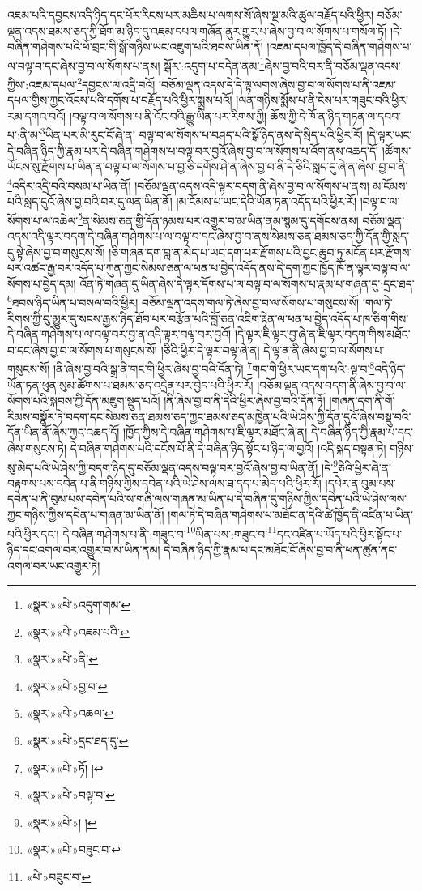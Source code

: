 འཇམ་པའི་དབྱངས་འདི་ཉིད་དང་པོར་རིངས་པར་མཆིས་པ་ལགས་སོ་ཞེས་སྔ་མའི་ཚུལ་བརྗོད་པའི་ཕྱིར། བཅོམ་ལྡན་འདས་ཐམས་ཅད་ཀྱི་ཐོག་མ་ཉིད་དུ་འཇམ་དཔལ་གཞོན་ནུར་གྱུར་པ་ཞེས་བྱ་བ་ལ་སོགས་པ་གསོལ་ཏོ། །དེ་བཞིན་གཤེགས་པའི་ཕོ་བྲང་གི་སྒོ་གཉིས་ཡང་འཇུག་པའི་ཐབས་ཡིན་ནོ། །འཇམ་དཔལ་ཁྱོད་དེ་བཞིན་གཤེགས་པ་ལ་བལྟ་བ་དང་ཞེས་བྱ་བ་ལ་སོགས་པ་ནས། སྒོར་:འདུག་པ་བདེན་ནམ་\footnote{«སྣར་»«པེ་»འདུག་གམ་}ཞེས་བྱ་བའི་བར་ནི་བཅོམ་ལྡན་འདས་ཀྱིས་:འཇམ་དཔལ་\footnote{«སྣར་»«པེ་»འཇམ་པའི་}དབྱངས་ལ་འདྲི་བའོ། །བཅོམ་ལྡན་འདས་དེ་དེ་ལྟ་ལགས་ཞེས་བྱ་བ་ལ་སོགས་པ་ནི་འཇམ་དཔལ་གྱིས་ཀྱང་འོངས་པའི་དགོས་པ་བརྗོད་པའི་ཕྱིར་སྨྲས་པའོ། །ལན་གཉིས་སྨོས་པ་ནི་ངེས་པར་གཟུང་བའི་ཕྱིར་རམ་དགའ་བའོ། །བལྟ་བ་ལ་སོགས་པ་ནི་འོང་བའི་རྒྱུ་ཡིན་པར་རིགས་ཀྱི། ཆོས་ཀྱི་དེ་ཁོ་ན་ཉིད་གཏན་ལ་དབབ་པ་:ནི་མ་\footnote{«སྣར་»«པེ་»ནི་}ཡིན་པར་མི་རུང་ངོ་ཞེ་ན། བལྟ་བ་ལ་སོགས་པ་བཤད་པའི་སྒོ་ཉིད་ནས་དེ་སྲིད་པའི་ཕྱིར་རོ། །དེ་ལྟར་ཡང་དེ་བཞིན་ཉིད་ཀྱི་རྣམ་པར་དེ་བཞིན་གཤེགས་པ་བལྟ་བར་བྱའོ་ཞེས་བྱ་བ་ལ་སོགས་པ་འོག་ནས་འཆད་དོ། །ཚོགས་ཡོངས་སུ་རྫོགས་པ་ཡིན་ན་བལྟ་བ་ལ་སོགས་པ་བྱ་ཅི་དགོས་ཤེ་ན་ཞེས་བྱ་བ་ནི་དེ་ཅིའི་སླད་དུ་ཞེ་ན་ཞེས་:བྱ་བ་ནི་\footnote{«སྣར་»«པེ་»བྱ་བ་}འདིར་འདྲི་བའི་བསམ་པ་ཡིན་ནོ། །བཅོམ་ལྡན་འདས་འདི་ལྟར་བདག་ནི་ཞེས་བྱ་བ་ལ་སོགས་པ་ནས། མ་ངོམས་པའི་སླད་དུའོ་ཞེས་བྱ་བའི་བར་དུ་ལན་ཡིན་ནོ། །མ་ངོམས་པ་ཡང་དེའི་ཡོན་ཏན་འདོད་པའི་ཕྱིར་རོ། །བལྟ་བ་ལ་སོགས་པ་ལ་འཆེལ་\footnote{«སྣར་»«པེ་»འཆལ་}ན་སེམས་ཅན་གྱི་དོན་ཉམས་པར་འགྱུར་བ་མ་ཡིན་ནམ་སྙམ་དུ་དགོངས་ནས། བཅོམ་ལྡན་འདས་འདི་ལྟར་བདག་དེ་བཞིན་གཤེགས་པ་ལ་བལྟ་བ་དང་ཞེས་བྱ་བ་ནས་སེམས་ཅན་ཐམས་ཅད་ཀྱི་དོན་གྱི་སླད་དུ་སྟེ་ཞེས་བྱ་བ་གསུངས་སོ། །ཅི་གཞན་དག་བླ་ན་མེད་པ་ཡང་དག་པར་རྫོགས་པའི་བྱང་ཆུབ་ཏུ་མངོན་པར་རྫོགས་པར་འཚང་རྒྱ་བར་འདོད་པ་ཀུན་ཀྱང་སེམས་ཅན་ལ་ཕན་པ་བྱེད་འདོད་ནས་དེ་དག་ཀྱང་ཁྱོད་ཁོ་ན་ལྟར་བལྟ་བ་ལ་སོགས་པ་བྱེད་དམ། འོན་ཏེ་གཞན་དུ་ཡིན་ཞེས་དེ་ལྟར་དོགས་པ་ལ་བལྟ་བ་ལ་སོགས་པ་རྣམ་པ་གཞན་དུ་:དྲང་ཐད་\footnote{«སྣར་»«པེ་»དྲང་ཐད་དུ་}ཐབས་ཉིད་ཡིན་པ་བསལ་བའི་ཕྱིར། བཅོམ་ལྡན་འདས་གལ་ཏེ་ཞེས་བྱ་བ་ལ་སོགས་པ་གསུངས་སོ། །གལ་ཏེ་རིགས་ཀྱི་བུ་མྱུར་དུ་སངས་རྒྱས་ཉིད་ཐོབ་པར་བརྩོན་པའི་བློ་ཅན་འཇིག་རྟེན་ལ་ཕན་པ་བྱེད་འདོད་པ་ཁ་ཅིག་གིས་དེ་བཞིན་གཤེགས་པ་ལ་བལྟ་བར་བྱ་ན་འདི་ལྟར་བལྟ་བར་བྱའོ། །དེ་ལྟར་ཇི་ལྟར་བྱ་ཞེ་ན་ཇི་ལྟར་བདག་གིས་མཐོང་བ་དང་ཞེས་བྱ་བ་ལ་སོགས་པ་གསུངས་སོ། །ཅིའི་ཕྱིར་དེ་ལྟར་བལྟ་ཞེ་ན། དེ་ལྟ་ན་ནི་ཞེས་བྱ་བ་ལ་སོགས་པ་གསུངས་སོ། །ནི་ཞེས་བྱ་བའི་སྒྲ་ནི་གང་གི་ཕྱིར་ཞེས་བྱ་བའི་དོན་ཏེ། \footnote{«སྣར་»«པེ་»ཏོ། ། }གང་གི་ཕྱིར་ཡང་དག་པའི་:ལྟ་བ་\footnote{«སྣར་»«པེ་»བལྟ་བ་}འདི་ཉིད་ཡོན་ཏན་ཕུན་སུམ་ཚོགས་པ་ཐམས་ཅད་འདྲེན་པར་བྱེད་པའི་ཕྱིར་རོ། །བཅོམ་ལྡན་འདས་བདག་ནི་ཞེས་བྱ་བ་ལ་སོགས་པའི་སྐབས་ཀྱི་དོན་མཇུག་སྡུད་པའོ། །ནི་ཞེས་བྱ་བ་ནི་དེའི་ཕྱིར་ཞེས་བྱ་བའི་དོན་ཏོ། །གཞན་དག་ནི་གོ་རིམས་བསྣོར་ཏེ་བདག་དང་སེམས་ཅན་ཐམས་ཅད་ཀྱང་ཐམས་ཅད་མཁྱེན་པའི་ཡེ་ཤེས་ཀྱི་དོན་དུའོ་ཞེས་བསྡུ་བའི་དོན་ཡིན་ནོ་ཞེས་ཀྱང་འཆད་དོ། །ཁྱོད་ཀྱིས་དེ་བཞིན་གཤེགས་པ་ཇི་ལྟར་མཐོང་ཞེ་ན། དེ་བཞིན་ཉིད་ཀྱི་རྣམ་པ་དང་ཞེས་གསུངས་ཏེ། དེ་བཞིན་གཤེགས་པའི་དངོས་པོ་ནི་དེ་བཞིན་ཉིད་སྟོང་པ་ཉིད་ལ་བྱའོ། །འདི་སྐད་བསྟན་ཏེ། གཉིས་སུ་མེད་པའི་ཡེ་ཤེས་ཀྱི་བདག་ཉིད་དུ་བཅོམ་ལྡན་འདས་བལྟ་བར་བྱའོ་ཞེས་བྱ་བ་ཡིན་ནོ། །དེ་\footnote{«སྣར་»«པེ་»། །}ཅིའི་ཕྱིར་ཞེ་ན་བརྟགས་པས་དབེན་པ་ནི་གཉིས་ཀྱིས་དབེན་པའི་ཡེ་ཤེས་ལས་ཐ་དད་པ་མེད་པའི་ཕྱིར་རོ། །དཔེར་ན་བུམ་པས་དབེན་པ་ནི་བུམ་པས་དབེན་པའི་ས་གཞི་ལས་གཞན་མ་ཡིན་པ་དེ་བཞིན་དུ་གཉིས་ཀྱིས་དབེན་པའི་ཡེ་ཤེས་ལས་ཀྱང་གཉིས་ཀྱིས་དབེན་པ་གཞན་མ་ཡིན་ནོ། །གལ་ཏེ་དེ་བཞིན་གཤེགས་པ་མཐོང་ན་དེའི་ཚེ་ཁྱོད་ནི་འཛིན་པ་ཡིན་པའི་ཕྱིར་དང་། དེ་བཞིན་གཤེགས་པ་ནི་:གཟུང་བ་\footnote{«སྣར་»«པེ་»བཟུང་བ་}ཡིན་པས་:གཟུང་བ་\footnote{«པེ་»བཟུང་བ་}དང་འཛིན་པ་ཡོད་པའི་ཕྱིར་སྟོང་པ་ཉིད་དང་འགལ་བར་འགྱུར་བ་མ་ཡིན་ནམ། དེ་བཞིན་ཉིད་ཀྱི་རྣམ་པ་དང་མཐོང་ངོ་ཞེས་བྱ་བ་ནི་ཕན་ཚུན་ནང་འགལ་བར་ཡང་འགྱུར་ཏེ། 
